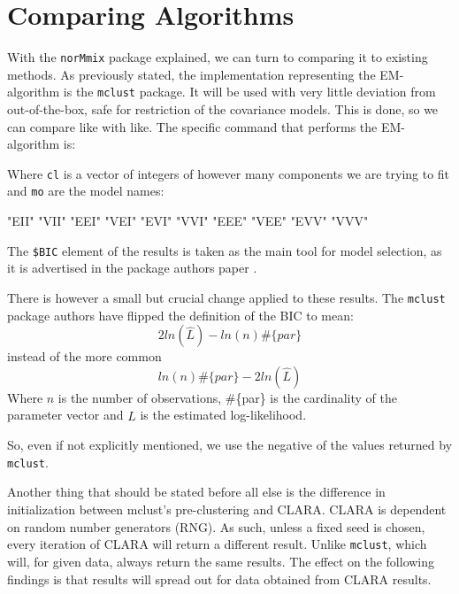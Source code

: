 \chapter{Comparing Algorithms}


With the {\tt norMmix} package explained, we can turn to comparing it to 
existing methods. As previously stated, the implementation representing the 
EM-algorithm is the {\tt mclust} package. It will be used with very little 
deviation from out-of-the-box, safe for restriction of the covariance models.
This is done, so we can compare like with like.
The specific command that performs the EM-algorithm is:

\begin{Schunk}
\end{Schunk}

Where {\tt cl} is a vector of integers of however many components we are trying 
to fit and {\tt mo} are the model names:

\begin{Schunk}
\begin{Soutput}
 [1] "EII" "VII" "EEI" "VEI" "EVI" "VVI" "EEE" "VEE" "EVV" "VVV"
\end{Soutput}
\end{Schunk}

The {\tt \$BIC} element of the results is taken as the main tool for model 
selection, as it is advertised in the package authors paper \cite{Scr16}.

There is however a small but crucial change applied to these results.
The {\tt mclust} package authors have flipped the definition of the BIC to mean:
\begin{equation} 
    2 ln(\hat{L}) - ln(n) \#\{par\}
\end{equation}
instead of the more common
\begin{equation} 
    ln(n) \#\{par\} - 2 ln(\hat{L})
\end{equation}
Where $n$ is the number of observations, \#\{par\} is the cardinality of the 
parameter vector and $$ is the estimated log-likelihood.

So, even if not explicitly mentioned, we use the negative of the values returned
by {\tt mclust}.

Another thing that should be stated before all else is the difference in 
initialization between {mclust}'s pre-clustering and CLARA. CLARA is dependent
on random number generators (RNG). As such, unless a fixed seed is chosen, 
every iteration of CLARA will return a different result. Unlike {\tt mclust}, 
which will, for given data, always return the same results. The effect on the 
following findings is that results will spread out for data obtained from 
CLARA results.


